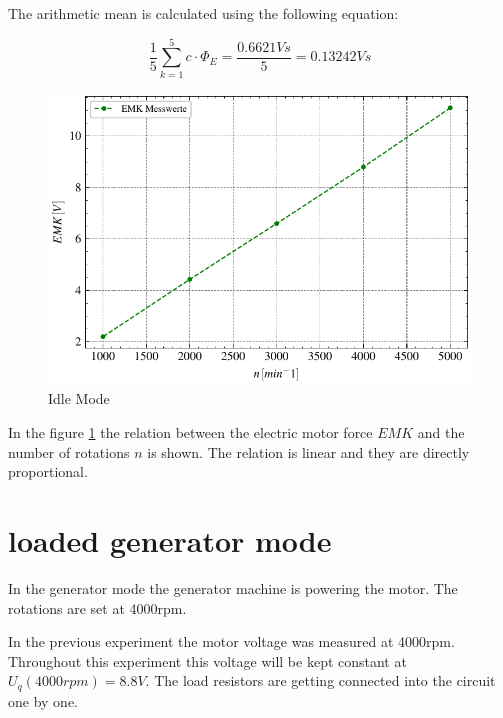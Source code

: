 \documentclass[conference]{IEEEtran}
\begin{document}
The arithmetic mean is calculated using the following equation:

\begin{equation}
    \frac{1}{5}\sum\limits_{k = 1}^{5} c \cdot \Phi_E = \frac{0.6621Vs}{5} = 0.13242Vs
\end{equation}

\begin{figure}[htbp]
    \centering
    \includegraphics[width=\columnwidth]{plots/4.1_Leerlaufversuch.pdf}
    \caption{Idle Mode}
    \label{fig:emk_n}
\end{figure}



In the figure \ref{fig:emk_n} the relation between the electric motor force
$EMK$ and the number of rotations $n$ is shown. The relation is linear and they
are directly proportional.


\section{loaded generator mode}

In the generator mode the generator machine is powering the motor. The
rotations are set at 4000rpm.

In the previous experiment the motor voltage was measured at 4000rpm.
Throughout this experiment this voltage will be kept constant at $U_q(4000rpm)
    = 8.8V$. The load resistors are getting connected into the circuit one by one.
\end{document}
